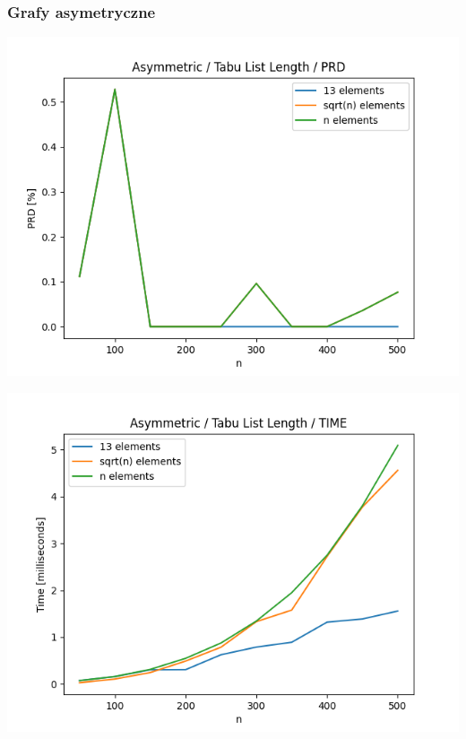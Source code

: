 \documentclass{article}
\begin{document}
\subsubsection{Grafy asymetryczne}

\begin{center}
\includegraphics[width=\textwidth, 
                   height = 0.4\textheight, 
                   keepaspectratio]
                  {plots/tabu_asymmetric_prd} 
\end{center}

\begin{center}
\includegraphics[width=\textwidth, 
                   height = 0.4\textheight, 
                   keepaspectratio]
                  {plots/tabu_asymmetric_time} 
\end{center}
\end{document}
